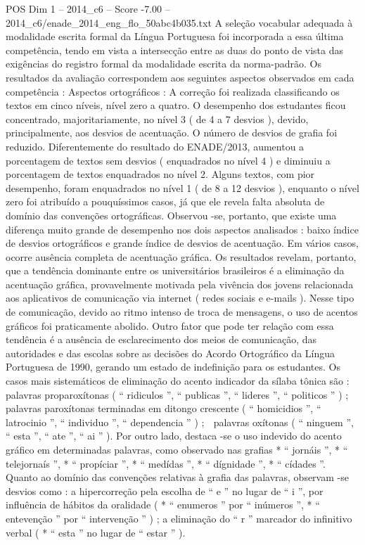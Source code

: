 \begin{textsample}{POS Dim 1 – 2014\_c6 – Score -7.00 – 2014\_c6/enade\_2014\_eng\_flo\_50abc4b035.txt}
A seleção vocabular adequada à modalidade escrita formal da Língua Portuguesa foi incorporada a essa última competência, tendo em vista a intersecção entre as duas do ponto de vista das exigências do registro formal da modalidade escrita da norma-padrão.
Os resultados da avaliação correspondem aos seguintes aspectos observados em cada competência : Aspectos ortográficos : A correção foi realizada classificando os textos em cinco níveis, nível zero a quatro.
O desempenho dos estudantes ficou concentrado, majoritariamente, no nível 3 ( de 4 a 7 desvios ), devido, principalmente, aos desvios de acentuação.
O número de desvios de grafia foi reduzido.
Diferentemente do resultado do ENADE/2013, aumentou a porcentagem de textos sem desvios ( enquadrados no nível 4 ) e diminuiu a porcentagem de textos enquadrados no nível 2.
Alguns textos, com pior desempenho, foram enquadrados no nível 1 ( de 8 a 12 desvios ), enquanto o nível zero foi atribuído a pouquíssimos casos, já que ele revela falta absoluta de domínio das convenções ortográficas.
Observou -se, portanto, que existe uma diferença muito grande de desempenho nos dois aspectos analisados : baixo índice de desvios ortográficos e grande índice de desvios de acentuação.
Em vários casos, ocorre ausência completa de acentuação gráfica.
Os resultados revelam, portanto, que a tendência dominante entre os universitários brasileiros é a eliminação da acentuação gráfica, provavelmente motivada pela vivência dos jovens relacionada aos aplicativos de comunicação via internet ( redes sociais e e-mails ).
Nesse tipo de comunicação, devido ao ritmo intenso de troca de mensagens, o uso de acentos gráficos foi praticamente abolido.
Outro fator que pode ter relação com essa tendência é a ausência de esclarecimento dos meios de comunicação, das autoridades e das escolas sobre as decisões do Acordo Ortográfico da Língua Portuguesa de 1990, gerando um estado de indefinição para os estudantes.
Os casos mais sistemáticos de eliminação do acento indicador da sílaba tônica são :  palavras proparoxítonas ( “ ridiculos ”, “ publicas ”, “ lideres ”, “ politicos ” ) ;  palavras paroxítonas terminadas em ditongo crescente ( “ homicidios ”, “ latrocinio ”, “ individuo ”, “ dependencia ” ) ;  palavras oxítonas ( “ ninguem ”, “ esta ”, “ ate ”, “ ai ” ).
Por outro lado, destaca -se o uso indevido do acento gráfico em determinadas palavras, como observado nas grafias * “ jornáis ”, * “ telejornaís ”, * “ propíciar ”, * “ medídas ”, * “ dígnidade ”, * “ cídades ”.
Quanto ao domínio das convenções relativas à grafia das palavras, observam -se desvios como : a hipercorreção pela escolha de “ e ” no lugar de “ i ”, por influência de hábitos da oralidade ( * “ enumeros ” por “ inúmeros ”, * “ entevenção ” por “ intervenção ” ) ; a eliminação do “ r ” marcador do infinitivo verbal ( * “ esta ” no lugar de “ estar ” ).

\end{textsample}
